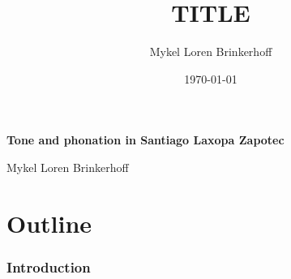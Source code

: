 \documentclass[12pt, letterpaper]{article}
\title{TITLE}
\author{Mykel Loren Brinkerhoff}
\date{\today}
\begin{document}
	
	
	
\begin{center}
	{\Large \textbf{Tone and phonation in Santiago Laxopa Zapotec}}
	\vspace{6pt}

	Mykel Loren Brinkerhoff
\end{center}
\thispagestyle{fancy}

\tableofcontents

\part{Outline} \label{part:Outline}
\section{Introduction} \label{sec:Introduction}
\end{document}

